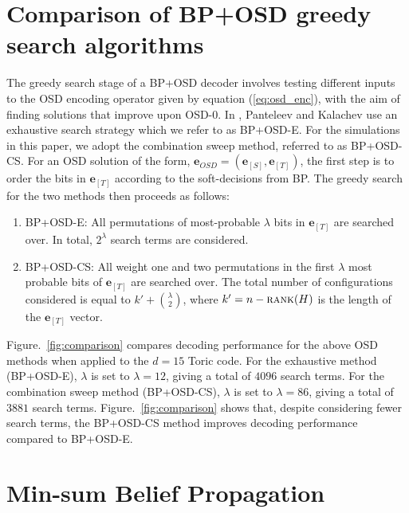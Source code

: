 \documentclass[%
 reprint,
superscriptaddress,
nofootinbib,
 amsmath,amssymb,
secnumarabic
]{revtex4-1}
\begin{document}
\section{Comparison of BP+OSD greedy search algorithms}\label{app:comparison}




The greedy search stage of a BP+OSD decoder involves testing different inputs to the OSD encoding operator given by equation (\ref{eq:osd_enc}), with the aim of finding solutions that improve upon OSD-0. In \cite{Panteleev_2019}, Panteleev and Kalachev use an exhaustive search strategy which we refer to as BP+OSD-E. For the simulations in this paper, we adopt the combination sweep method, referred to as BP+OSD-CS. For an OSD solution of the form, $\textbf{e}_{OSD}=(\textbf{e}_{[S]},\textbf{e}_{[T]})$, the first step is to order the bits in $\textbf{e}_{[T]}$ according to the soft-decisions from BP. The greedy search for the two methods then proceeds as follows:
%
\begin{enumerate}
	\item BP+OSD-E: All permutations of most-probable $\lambda$ bits in $\textbf{e}_{[T]}$ are searched over. In total, $2^\lambda$ search terms are considered.
	\item BP+OSD-CS: All weight one and two permutations in the first $\lambda$ most probable bits of $\textbf{e}_{[T]}$ are searched over. The total number of configurations considered is equal to $k'+{\lambda \choose 2}$, where $k'=n-\text{\sc rank}(H)$ is the length of the $\mathbf{e}_{[T]}$ vector.
	  
\end{enumerate}
%
Figure.~\ref{fig:comparison} compares decoding performance for the above OSD methods when applied to the $d=15$ Toric code. For the exhaustive method (BP+OSD-E), $\lambda$ is set to $\lambda=12$, giving a total of $4096$ search terms. For the combination sweep method (BP+OSD-CS), $\lambda$ is set to $\lambda=86$, giving a total of $3881$ search terms. Figure.~\ref{fig:comparison} shows that, despite considering fewer search terms, the BP+OSD-CS method improves decoding performance compared to BP+OSD-E.



\section{Min-sum Belief Propagation}\label{app:bp}



\end{document}
